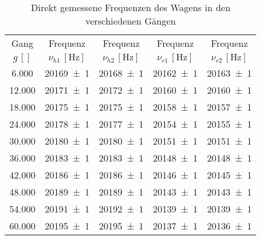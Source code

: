 \begin{table}[!h]
	\centering
	\begin{tabular}{|c|c|c|c|c|}
		\hline
		Gang & Frequenz & Frequenz & Frequenz & Frequenz\\
		$g\,[\si{}]$ & $\nu_{h1}\,[\si{\hertz}]$ & $\nu_{h2}\,[\si{\hertz}]$ & $\nu_{r1}\,[\si{\hertz}]$ & $\nu_{r2}\,[\si{\hertz}]$\\\hline\hline
		\num{6.000}  & \num{20169(1)}  & \num{20168(1)}  & \num{20162(1)}  & \num{20163(1)} \\
		\num{12.000}  & \num{20171(1)}  & \num{20172(1)}  & \num{20160(1)}  & \num{20160(1)} \\
		\num{18.000}  & \num{20175(1)}  & \num{20175(1)}  & \num{20158(1)}  & \num{20157(1)} \\
		\num{24.000}  & \num{20178(1)}  & \num{20177(1)}  & \num{20154(1)}  & \num{20155(1)} \\
		\num{30.000}  & \num{20180(1)}  & \num{20180(1)}  & \num{20151(1)}  & \num{20151(1)} \\
		\num{36.000}  & \num{20183(1)}  & \num{20183(1)}  & \num{20148(1)}  & \num{20148(1)} \\
		\num{42.000}  & \num{20186(1)}  & \num{20186(1)}  & \num{20146(1)}  & \num{20145(1)} \\
		\num{48.000}  & \num{20189(1)}  & \num{20189(1)}  & \num{20143(1)}  & \num{20143(1)} \\
		\num{54.000}  & \num{20191(1)}  & \num{20192(1)}  & \num{20139(1)}  & \num{20139(1)} \\
		\num{60.000}  & \num{20195(1)}  & \num{20195(1)}  & \num{20137(1)}  & \num{20136(1)} \\
		\hline
	\end{tabular}
	\caption{Direkt gemessene Frequenzen des Wagens in den verschiedenen Gängen \label{tab:Auswertung_Frequenz_Direkt}}
\end{table}
